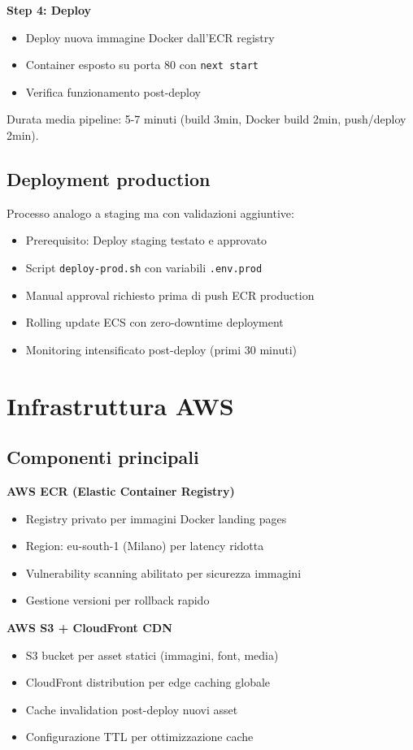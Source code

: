 \textbf{Step 4: Deploy}
\begin{itemize}
  \item Deploy nuova immagine Docker dall'ECR registry
  \item Container esposto su porta 80 con \texttt{next start}
  \item Verifica funzionamento post-deploy
\end{itemize}

Durata media pipeline: 5-7 minuti (build 3min, Docker build 2min, push/deploy 2min).

\subsection{Deployment production}
Processo analogo a staging ma con validazioni aggiuntive:
\begin{itemize}
  \item Prerequisito: Deploy staging testato e approvato
  \item Script \texttt{deploy-prod.sh} con variabili \texttt{.env.prod}
  \item Manual approval richiesto prima di push ECR production
  \item Rolling update ECS con zero-downtime deployment
  \item Monitoring intensificato post-deploy (primi 30 minuti)
\end{itemize}

\section{Infrastruttura AWS}

\subsection{Componenti principali}
\textbf{AWS ECR (Elastic Container Registry)}
\begin{itemize}
  \item Registry privato per immagini Docker landing pages
  \item Region: eu-south-1 (Milano) per latency ridotta
  \item Vulnerability scanning abilitato per sicurezza immagini
  \item Gestione versioni per rollback rapido
\end{itemize}

\textbf{AWS S3 + CloudFront CDN}
\begin{itemize}
  \item S3 bucket per asset statici (immagini, font, media)
  \item CloudFront distribution per edge caching globale
  \item Cache invalidation post-deploy nuovi asset
  \item Configurazione TTL per ottimizzazione cache
\end{itemize}

